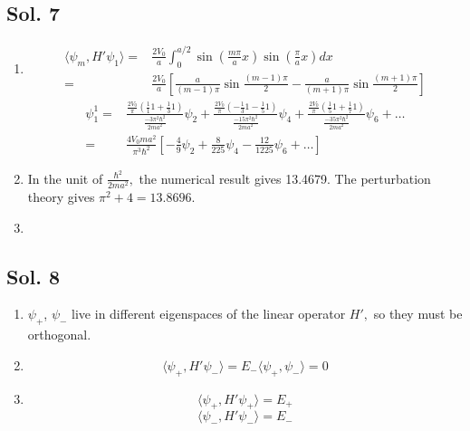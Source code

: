 \subsection*{Sol. 7}
\begin{enumerate}
    \item 
    \begin{align*}
        \langle\psi_m, H'\psi_1\rangle=&
        \frac{2V_0}a\int_0^{a/2}
        \sin\left(\frac{m\pi}{a}x\right)
        \sin\left(\frac{\pi}{a}x\right)dx\\
        =&\frac{2V_0}{a}
        \left[
        \frac{a}{(m-1)\pi}\sin\frac{(m-1)\pi}{2}
        -
        \frac{a}{(m+1)\pi}\sin\frac{(m+1)\pi}{2}
        \right]
    \end{align*}
    \begin{align*}
        \psi_1^1 =& 
        \frac{\frac{2V_0}{\pi}(\frac{1}{1}1+\frac{1}{3}1)}
        {\frac{-3\pi^2\hbar^2}{2ma^2}}\psi_2 +
        \frac{\frac{2V_0}{\pi}(-\frac{1}{3}1-\frac{1}{5}1)}
        {\frac{-15\pi^2\hbar^2}{2ma^2}}\psi_4 +
        \frac{\frac{2V_0}{\pi}(\frac{1}{5}1+\frac{1}{7}1)}
        {\frac{-35\pi^2\hbar^2}{2ma^2}}\psi_6+\dots\\
        =&
        \frac{4V_0ma^2}{\pi^3\hbar^2}
        \left[-\frac{4}{9}\psi_2 + \frac{8}{225}\psi_4 - \frac{12}{1225}\psi_6+\dots\right]
    \end{align*}
    \item 
    In the unit of $\frac{\hbar^2}{2ma^2},$ the numerical result gives 13.4679. The perturbation theory gives $\pi^2+4=13.8696.$
    \item 
\end{enumerate}
\subsection*{Sol. 8}
\begin{enumerate}
    \item 
    $\psi_+$, $\psi_-$ live in different eigenspaces of the linear operator $H',$ so they must be orthogonal. 
    \item 
    $$
    \langle \psi_+,H'\psi_-\rangle = E_-\langle\psi_+,\psi_-\rangle = 0
    $$
    \item 
    $$
    \langle \psi_+,H'\psi_+\rangle = E_+
    $$
    $$
    \langle \psi_-,H'\psi_-\rangle = E_-
    $$
    
\end{enumerate}

